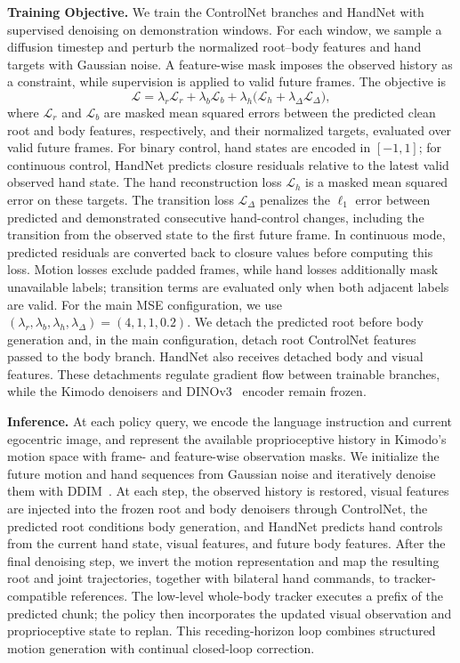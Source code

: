 \textbf{Training Objective.} We train the ControlNet branches and HandNet with supervised denoising on demonstration windows. For each window, we sample a diffusion timestep and perturb the normalized root--body features and hand targets with Gaussian noise. A feature-wise mask imposes the observed history as a constraint, while supervision is applied to valid future frames. The objective is
\begin{equation}
  \mathcal{L}=\lambda_r\mathcal{L}_{r}+\lambda_b\mathcal{L}_{b}
  +\lambda_h\bigl(\mathcal{L}_{h}+\lambda_{\Delta}\mathcal{L}_{\Delta}\bigr),
  \label{eq:policy_training_objective}
\end{equation}
where $\mathcal{L}_{r}$ and $\mathcal{L}_{b}$ are masked mean squared errors between the predicted clean root and body features, respectively, and their normalized targets, evaluated over valid future frames. For binary control, hand states are encoded in $[-1,1]$; for continuous control, HandNet predicts closure residuals relative to the latest valid observed hand state. The hand reconstruction loss $\mathcal{L}_{h}$ is a masked mean squared error on these targets. The transition loss $\mathcal{L}_{\Delta}$ penalizes the $\ell_1$ error between predicted and demonstrated consecutive hand-control changes, including the transition from the observed state to the first future frame. In continuous mode, predicted residuals are converted back to closure values before computing this loss. Motion losses exclude padded frames, while hand losses additionally mask unavailable labels; transition terms are evaluated only when both adjacent labels are valid. For the main MSE configuration, we use $(\lambda_r,\lambda_b,\lambda_h,\lambda_{\Delta})=(4,1,1,0.2)$. We detach the predicted root before body generation and, in the main configuration, detach root ControlNet features passed to the body branch. HandNet also receives detached body and visual features. These detachments regulate gradient flow between trainable branches, while the Kimodo denoisers and DINOv3~\citep{dinov3} encoder remain frozen.

\textbf{Inference.} At each policy query, we encode the language instruction and current egocentric image, and represent the available proprioceptive history in Kimodo's motion space with frame- and feature-wise observation masks. We initialize the future motion and hand sequences from Gaussian noise and iteratively denoise them with DDIM~\citep{song2022denoisingdiffusionimplicitmodels}. At each step, the observed history is restored, visual features are injected into the frozen root and body denoisers through ControlNet, the predicted root conditions body generation, and HandNet predicts hand controls from the current hand state, visual features, and future body features. After the final denoising step, we invert the motion representation and map the resulting root and joint trajectories, together with bilateral hand commands, to tracker-compatible references. The low-level whole-body tracker executes a prefix of the predicted chunk; the policy then incorporates the updated visual observation and proprioceptive state to replan. This receding-horizon loop combines structured motion generation with continual closed-loop correction.
